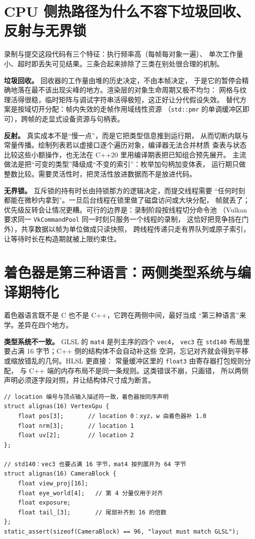 \documentclass[12pt,a4paper,fontset=fandol]{ctexbook}
\newcommand{\cpp}[1]{C++#1}
\newcommand{\Tp}[1]{\texttt{#1}}
\newcommand{\Lang}[1]{\textsf{#1}}
\newcommand{\CL}{\Lang{C}}
\newcommand{\CPP}{\Lang{C++}}
\newcommand{\DomCPU}{\Lang{CPU}}
\newcommand{\GSL}{\Lang{GLSL}}
\newcommand{\HSL}{\Lang{HLSL}}
\begin{document}
\section{\DomCPU{} 侧热路径为什么不容下垃圾回收、反射与无界锁}

录制与提交这段代码有三个特征：执行频率高（每帧每对象一遍）、
单次工作量小、超时即丢失可见结果。三条合起来排除了三类在别处很合理的机制。

\textbf{垃圾回收。} 回收器的工作量由堆的历史决定，不由本帧决定，
于是它的暂停会精确地落在最不该出现尖峰的地方。渲染层的对象生命周期又极不均匀：
网格与纹理活得很稳，临时矩阵与调试字符串活得极短，这正好让分代假设失效。
替代方案是按域切开分配：帧内失效的走帧作用域线性资源
（\Tp{std::pmr} 的单调缓冲区即可），跨帧的走显式设备资源与句柄表。

\textbf{反射。} 真实成本不是``慢一点''，而是它把类型信息推到运行期，
从而切断内联与常量传播。绘制列表若以虚接口逐个遍历对象，编译器无法合并材质
查表与状态比较这些小额操作，也无法在 \cpp{20} 里用编译期表把已知组合预先展开。
主流做法是把``可变的类型''降级成``不变的索引''：枚举加句柄加变体表，
运行期只做整数比较。需要灵活性时，把灵活性放进数据而不是放进代码。

\textbf{无界锁。} 互斥锁的持有时长由持锁那方的逻辑决定，而提交线程需要
``任何时刻都能在微秒内拿到''。一旦后台线程在锁里做了磁盘访问或大块分配，
帧就丢了；优先级反转会让情况更糟。可行的边界是：录制阶段按线程切分命令池
（Vulkan 要求同一 \Tp{VkCommandPool} 同一时刻只服务一个线程的录制，
这恰好把竞争挡在门外），共享数据以帧为单位做成只读快照，
跨线程传递只走有界队列或原子索引，让等待时长在构造期就被上限约束住。

\section{着色器是第三种语言：两侧类型系统与编译期特化}

着色器语言既不是 \CL{} 也不是 \CPP{}，它跨在两侧中间，最好当成
``第三种语言''来学。差异在四个地方。

\textbf{类型系统不一致。} \GSL{} 的 \Tp{mat4} 是列主序的四个 \Tp{vec4}，
\Tp{vec3} 在 \Tp{std140} 布局里要占满 16 字节；\CPP{} 侧的结构体不会自动补这些
空洞，忘记对齐就会得到平移或缩放错乱的几何。\HSL{} 更直接：
常量缓冲区里的 \Tp{float3} 由寄存器打包规则分配，
与 \CPP{} 端的内存布局不是同一条规则。这类错误不崩，只画错，
所以两侧声明必须逐字段对照，并让结构体尺寸成为断言。

\begin{lstlisting}[style=cppstyle,caption={与着色器侧逐字段对应的顶点与常量缓冲声明},label={lst:ch01-cpu-side}]
// location 编号与顶点输入描述符一致，着色器按同序声明
struct alignas(16) VertexGpu {
    float pos[3];       // location 0：xyz，w 由着色器补 1.0
    float nrm[3];       // location 1
    float uv[2];        // location 2
};

// std140：vec3 也要占满 16 字节，mat4 按列展开为 64 字节
struct alignas(16) CameraBlock {
    float view_proj[16];
    float eye_world[4];   // 第 4 分量仅用于对齐
    float exposure;
    float tail_[3];       // 尾部补齐到 16 的倍数
};
static_assert(sizeof(CameraBlock) == 96, "layout must match GLSL");
\end{lstlisting}
\end{document}

